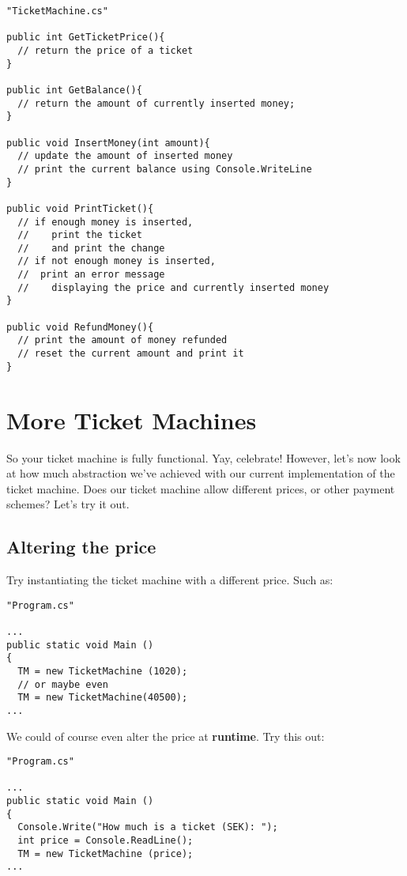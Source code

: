 \documentclass{article}
\begin{document}
\begin{lstlisting}
"TicketMachine.cs"

public int GetTicketPrice(){
  // return the price of a ticket
}

public int GetBalance(){
  // return the amount of currently inserted money;
}

public void InsertMoney(int amount){
  // update the amount of inserted money
  // print the current balance using Console.WriteLine
}

public void PrintTicket(){
  // if enough money is inserted,
  //    print the ticket
  //    and print the change
  // if not enough money is inserted,
  //  print an error message
  //    displaying the price and currently inserted money
}

public void RefundMoney(){
  // print the amount of money refunded
  // reset the current amount and print it
}
\end{lstlisting}












\pagebreak
\section{More Ticket Machines}
So your ticket machine is fully functional. Yay, celebrate! However, let’s now look at how much abstraction we’ve achieved with our current implementation of the ticket machine. Does our ticket machine allow different prices, or other payment schemes? Let’s try it out.
\subsection{Altering the price}
Try instantiating the ticket machine with a different price. Such as:
\begin{lstlisting}
"Program.cs"

...
public static void Main ()
{ 
  TM = new TicketMachine (1020);
  // or maybe even
  TM = new TicketMachine(40500);
...
\end{lstlisting}
We could of course even alter the price at \textbf{runtime}. Try this out:
\begin{lstlisting}
"Program.cs"

...
public static void Main ()
{ 
  Console.Write("How much is a ticket (SEK): ");
  int price = Console.ReadLine();
  TM = new TicketMachine (price);
...
\end{lstlisting}
\end{document}
